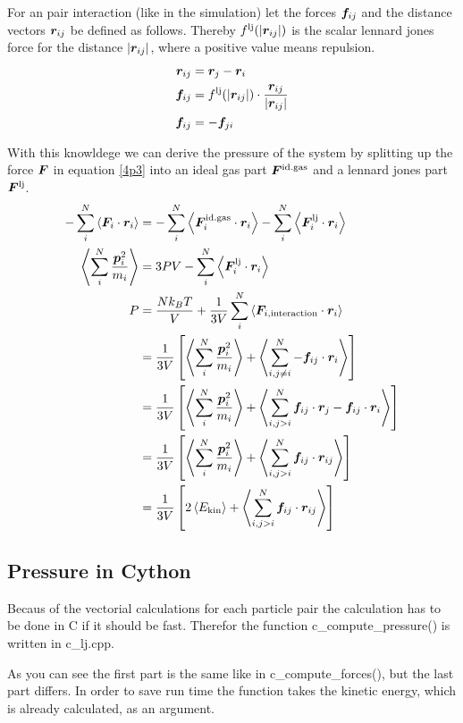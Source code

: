 For an pair interaction (like in the simulation) let the forces $\boldsymbol{f}_{ij}$ and the distance vectors $\boldsymbol{r}_{ij}$ be defined as follows. Thereby $f^\text{lj}(\left| \boldsymbol{r}_{ij}\right|)$ is the scalar lennard jones force for the distance $\left| \boldsymbol{r}_{ij}\right|$, where a positive value means repulsion.
\begin{align}
\boldsymbol{r}_{ij}
	&=\boldsymbol{r}_{j} - \boldsymbol{r}_{i}
	\label{4rij}\\
\boldsymbol{f}_{ij} 
	&= f^\text{lj}(\left| \boldsymbol{r}_{ij}\right|)\cdot\frac{\boldsymbol{r}_{ij}}{\left| \boldsymbol{r}_{ij}\right|}
	\label{4fij}\\
\boldsymbol{f}_{ij}
	&=-\boldsymbol{f}_{ji}
\end{align}

With this knowldege we can derive the pressure of the system by splitting up the force $\boldsymbol{F}$ in equation \eqref{4p3} into an ideal gas part $\boldsymbol{F}^\text{id.gas}$ and a lennard jones part $\boldsymbol{F}^\text{lj}$.
\begin{align}
-\sum_i^N\left\langle\boldsymbol{F}_i\cdot\boldsymbol{r}_i\right\rangle
	&=-\sum_i^N\left\langle\boldsymbol{F}_i^\text{id.gas}\cdot\boldsymbol{r}_i\right\rangle -\sum_i^N\left\langle\boldsymbol{F}_i^\text{lj}\cdot\boldsymbol{r}_i\right\rangle
	\label{4p4}\\
\left\langle\sum_i^N\frac{\boldsymbol{p}_i^2}{m_i}\right\rangle
	&=3PV - \sum_i^N\left\langle\boldsymbol{F}_i^\text{lj}\cdot\boldsymbol{r}_i\right\rangle
	\label{4p5}\\
P
	&=\frac{Nk_BT}{V} + \frac{1}{3V}\sum_i^N\left\langle\boldsymbol{F}_{i,\text{interaction}}\cdot\boldsymbol{r}_i\right\rangle
	\label{4p6}\\
	&=\frac{1}{3V}\left[\left\langle\sum_i^N\frac{\boldsymbol{p}_i^2}{m_i}\right\rangle + \left\langle\sum_{i,j\neq i}^N-\boldsymbol{f}_{ij}\cdot\boldsymbol{r}_i\right\rangle\right]
	\label{4p7}\\
	&=\frac{1}{3V}\left[\left\langle\sum_i^N\frac{\boldsymbol{p}_i^2}{m_i}\right\rangle + \left\langle\sum_{i,j>i}^N\boldsymbol{f}_{ij}\cdot\boldsymbol{r}_{j}-\boldsymbol{f}_{ij}\cdot\boldsymbol{r}_{i}\right\rangle\right]
	\label{4p8}\\
	&=\frac{1}{3V}\left[\left\langle\sum_i^N\frac{\boldsymbol{p}_i^2}{m_i}\right\rangle + \left\langle\sum_{i,j>i}^N\boldsymbol{f}_{ij}\cdot\boldsymbol{r}_{ij}\right\rangle\right]
	\label{4p9}\\
	&=\frac{1}{3V}\left[ 2\left\langle E_\text{kin}\right\rangle + \left\langle\sum_{i,j>i}^N\boldsymbol{f}_{ij}\cdot\boldsymbol{r}_{ij}\right\rangle\right]
	\label{4p10}
\end{align}

\subsection*{Pressure in Cython}

Becaus of the vectorial calculations for each particle pair the calculation has to be done in C if it should be fast. 
Therefor the function c\_compute\_pressure() is written in c\_lj.cpp.


As you can see the first part is the same like in c\_compute\_forces(), but the last part differs.
In order to save run time the function takes the kinetic energy, which is already calculated, as an argument.